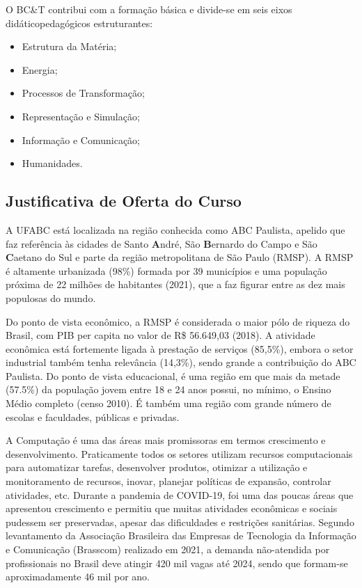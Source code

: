 O BC\&T contribui com a formação básica e divide-se em seis eixos didáticopedagógicos estruturantes:
\begin{itemize}
	\item Estrutura da Matéria;
	\item Energia;
	\item Processos de Transformação;
	\item Representação e Simulação;
	\item Informação e Comunicação;
	\item Humanidades.
\end{itemize}


\subsection{Justificativa de Oferta do Curso}

A UFABC está localizada na região conhecida como ABC Paulista, apelido que faz referência às cidades de Santo \textbf{A}ndré, São \textbf{B}ernardo do Campo e São \textbf{C}aetano do Sul e parte da região metropolitana de São Paulo (RMSP). A RMSP é altamente urbanizada (98\%) formada por 39 municípios e uma população próxima de 22 milhões de habitantes (2021), que a faz figurar entre as dez mais populosas do mundo. 

Do ponto de vista econômico, a RMSP é considerada o maior pólo de riqueza do Brasil, com PIB per capita no valor de R\$ 56.649,03 (2018). A atividade econômica está fortemente ligada à prestação de serviços (85,5\%), embora o setor industrial também tenha relevância (14,3\%), sendo grande a contribuição do ABC Paulista. 
Do ponto de vista educacional, é uma região em que mais da metade (57.5\%) da população jovem entre 18 e 24 anos possui, no mínimo, o Ensino Médio completo (censo 2010). É também uma região com grande número de escolas e faculdades, públicas e privadas. 

A Computação é uma das áreas mais promissoras em termos crescimento e desenvolvimento. Praticamente todos os setores utilizam recursos computacionais para automatizar tarefas, desenvolver produtos, otimizar a utilização e monitoramento de recursos, inovar, planejar políticas de expansão, controlar atividades, etc. Durante a pandemia de COVID-19, foi uma das poucas áreas que apresentou crescimento e permitiu que muitas atividades econômicas e sociais pudessem ser preservadas, apesar das dificuldades e restrições sanitárias. Segundo levantamento da Associação Brasileira das Empresas de Tecnologia da Informação e Comunicação (Brasscom) realizado em 2021, a demanda não-atendida por profissionais no Brasil deve atingir 420 mil vagas até 2024, sendo que formam-se aproximadamente 46 mil por ano.

